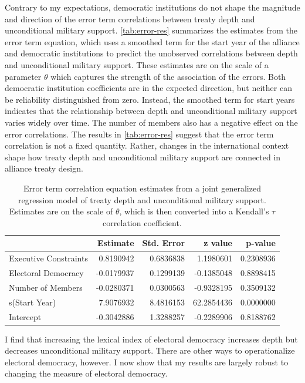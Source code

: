 \documentclass[12pt]{article}
\begin{document}
Contrary to my expectations, democratic institutions do not shape the magnitude and direction of the error term correlations between treaty depth and unconditional military support.
\autoref{tab:error-res} summarizes the estimates from the error term equation, which uses a smoothed term for the start year of the alliance and democratic institutions to predict the unobserved correlations between depth and unconditional military support. 
These estimates are on the scale of a parameter $\theta$ which captures the strength of the association of the errors. 
Both democratic institution coefficients are in the expected direction, but neither can be reliability distinguished from zero. 
Instead, the smoothed term for start years indicates that the relationship between depth and unconditional military support varies widely over time. 
The number of members also has a negative effect on the error correlations. 
The results in \autoref{tab:error-res} suggest that the error term correlation is not a fixed quantity. 
Rather, changes in the international context shape how treaty depth and unconditional military support are connected in alliance treaty design.


\begin{table}[ht]
\centering
\begin{tabular}{lrrrr}
  \hline
 & Estimate & Std. Error & z value & p-value \\ 
  \hline
  Executive Constraints & 0.8190942 & 0.6836838 & 1.1980601 & 0.2308936 \\ 
  Electoral Democracy & -0.0179937 & 0.1299139 & -0.1385048 & 0.8898415 \\ 
  Number of Members & -0.0280371 & 0.0300563 & -0.9328195 & 0.3509132 \\ 
  s(Start Year) & 7.9076932 & 8.4816153 & 62.2854436 & 0.0000000 \\ 
  Intercept & -0.3042886 & 1.3288257 & -0.2289906 & 0.8188762 \\ 
   \hline
\end{tabular}
\caption{Error term correlation equation estimates from a joint generalized regression model of treaty depth and unconditional military support. 
                    Estimates are on the scale of $\theta$, which is then converted into a Kendall's $\tau$ correlation coefficient. 
                    } 
\label{tab:error-res}
\end{table}


I find that increasing the lexical index of electoral democracy increases depth but decreases unconditional military support. 
There are other ways to operationalize electoral democracy, however. 
I now show that my results are largely robust to changing the measure of electoral democracy. 
\end{document}

